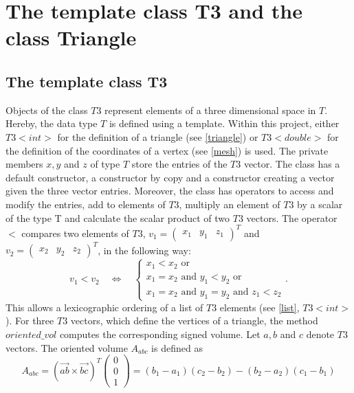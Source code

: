 \documentclass[10pt]{article}
\begin{document}
\section{The template class T3 and the class Triangle}

\subsection{The template class T3} \label{T3}

Objects of the class $T3$ represent elements of a three dimensional space in $T$. Hereby, the data type $T$ is defined using a template. Within this project, either $T3<int>$ for the definition of a triangle (see \ref{triangle}) or $T3<double>$ for the definition of the coordinates of a vertex (see \ref{mesh}) is used. The private members $x,y$ and $z$ of type $T$ store the entries of the $T3$ vector. The class has a default constructor, a constructor by copy and a constructor creating a vector given the three vector entries. Moreover, the class has operators to access and modify the entries, add to elements of $T3$, multiply an element of $T3$ by a scalar of the type T and calculate the scalar product of two $T3$ vectors. The operator $<$ compares two elements of $T3$, $v_1 = \begin{pmatrix} x_1 & y_1 & z_1 \end{pmatrix}^T$ and $v_2 = \begin{pmatrix} x_2 & y_2 & z_2 \end{pmatrix}^T$, in the following way:
$$ v_1 < v_2 \quad \Leftrightarrow \quad \begin{cases}
 x_1 < x_2 \text{ or }\\
 x_1 = x_2 \text{ and } y_1 < y_2 \text{ or }\\
 x_1 = x_2 \text{ and } y_1 = y_2 \text{ and } z_1 < z_2
\end{cases}. $$ 
This allows a lexicographic ordering of a list of $T3$ elements (see \ref{list}, $T3<int>$). For three $T3$ vectors, which define the vertices of a triangle, the method $ oriented\_vol $ computes the corresponding signed volume. Let $a,b$ and $c$ denote $T3$ vectors. The oriented volume $A_{abc}$ is defined as
$$ A_{abc} = \left( \overrightarrow{ab} \times \overrightarrow{bc} \right)^T \begin{pmatrix} 0 \\ 0 \\ 1 \end{pmatrix} = (b_1-a_1)(c_2-b_2) - (b_2-a_2)(c_1-b_1)$$
\end{document}
